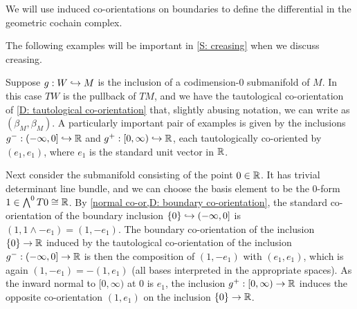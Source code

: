 We will use induced co-orientations on boundaries to define the differential in the geometric cochain complex.  


The following examples will be important in \cref{S: creasing} when we discuss creasing.

\begin{example}\label{E: splitting example 1}
Suppose $g:W\hookrightarrow M$ is the inclusion of a codimension-$0$ submanifold of $M$. In this case $TW$ is the pullback of $TM$, and we have the tautological co-orientation of \cref{D: tautological co-orientation} that, slightly abusing notation, we can write as $(\beta_M,\beta_M)$.  A particularly important pair of examples is given by the inclusions  $g^-:(-\infty, 0]\hookrightarrow \mathbb{R}$ and  $g^+:[0,\infty)\hookrightarrow \mathbb{R}$, each tautologically co-oriented by $(e_1,e_1)$, where $e_1$ is the standard unit vector in $\mathbb{R}$. 

Next consider the submanifold consisting of the point $0\in \mathbb{R}$. It has trivial determinant line bundle, and we can choose the basis element to be the $0$-form $1\in \bigwedge^0 T0\cong \mathbb{R}$. By \cref{normal co-or,D: boundary co-orientation}, the standard co-orientation of the boundary inclusion $\{0\}\hookrightarrow  (-\infty, 0]$ is $(1,1\wedge -e_1)=(1,-e_1)$. The boundary co-orientation of the inclusion $\{0\}\to \mathbb{R}$ induced by the tautological co-orientation of the inclusion $g^-:(-\infty, 0]\to \mathbb{R}$ is then the composition of $(1,-e_1)$ with $(e_1,e_1)$, which is again $(1,-e_1)=-(1,e_1)$ (all bases interpreted in the appropriate spaces). As the inward normal to $[0,\infty)$ at $0$ is $e_1$, the inclusion $g^+:[0,\infty)\to \mathbb{R}$ induces the opposite co-orientation $(1,e_1)$ on  the inclusion $\{0\}\to \mathbb{R}$. 
\end{example}

